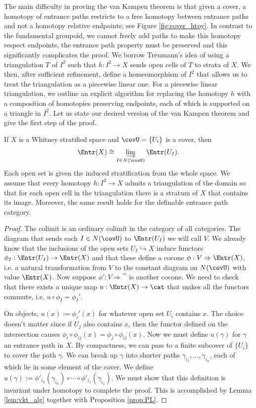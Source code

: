 The main difficulty in proving the van Kampen theorem is that given a cover, a homotopy of entrance paths restricts to a free homotopy between entrance paths and not a homotopy relative endpoints; see Figure \ref{fig:cover_htpy}. In contrast to the fundamental groupoid, we cannot freely add paths to make this homotopy respect endpoints, the entrance path property must be preserved and this significantly complicates the proof. We borrow Treumann's idea of using a triangulation $T$ of $I^2$ such that $h:I^2\to X$ sends open cells of $T$ to strata of $X$. We then, after sufficient refinement, define a homeomorphism of $I^2$ that allows us to treat the triangulation as a piecewise linear one. For a piecewise linear triangulation, we outline an explicit algorithm for replacing the homotopy $h$ with a composition of homotopies preserving endpoints, each of which is supported on a triangle in $I^2$. Let us state our desired version of the van Kampen theorem and give the first step of the proof.

\begin{thm}\label{thm:vkt_ep}
	If $X$ is a Whitney stratified space and $\covU=\{U_i\}$ is a cover, then
	\[
		\Entr(X)\cong \varinjlim_{I\in N(\covU)}\Entr(U_I).
	\]
	Each open set is given the induced stratification from the whole space. We assume that every homotopy $h:I^2\to X$ admits a triangulation of the domain so that for each open cell in the triangulation there is a stratum of $X$ that contains its image. Moreover, the same result holds for the definable entrance path category.
\end{thm}
\begin{proof}
	The colimit is an ordinary colimit in the category of all categories. The diagram that sends each $I\in N(\covU)$ to $\Entr(U_I)$ we will call $V$. We already know that the inclusions of the open sets $U_I\hookrightarrow X$ induce functors $\phi_I:\Entr(U_I)\to \Entr(X)$ and that these define a cocone $\phi:V\Rightarrow \Entr(X)$, i.e. a natural transformation from $V$ to the constant diagram on $N(\covU)$ with value $\Entr(X)$. Now suppose $\phi':V\Rightarrow \cat$ is another cocone. We need to check that there exists a unique map $u:\Entr(X)\to\cat$ that makes all the functors commute, i.e. $u\circ \phi_I=\phi_I'$.
	
	On objects, $u(x):=\phi_i'(x)$ for whatever open set $U_i$ contains $x$. The choice doesn't matter since if $U_j$ also contains $x$, then the functor defined on the intersection causes $\phi_i\circ \phi_{ij}(x)=\phi_j\circ\phi_{ij}(x)$. Now we must define $u(\gamma)$ for $\gamma$ an entrance path in $X$. By compactness, we can pass to a finite subcover of $\{U_i\}$ to cover the path $\gamma$. We can break up $\gamma$ into shorter paths $\gamma_{i_1},\ldots,\gamma_{i_n}$, each of which lie in some element of the cover. We define $u(\gamma):=\phi'_{i_n}(\gamma_{i_n})\circ \cdots \circ \phi'_{i_1}(\gamma_{i_1})$. We must show that this definition is invariant under homotopy to complete the proof. This is accomplished by Lemma \ref{lem:vkt_alg} together with Proposition \ref{prop:PL}.
\end{proof}
	
